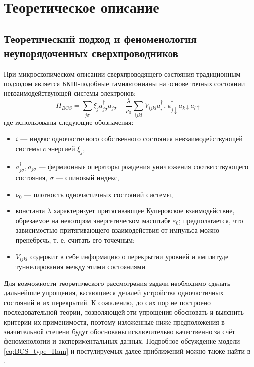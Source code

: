 \chapter{Теоретическое описание} \label{Theor}
\section{Теоретический подход и феноменология неупорядоченных сверхпроводников}
При микроскопическом описании сверхпроводящего состояния традиционным подходом является БКШ-подобные гамильтонианы на основе точных состояний невзаимодействующей системы электронов:
\begin{equation}
\label{eq:BCS_type_Ham}
H_{BCS} = \sum_{j\sigma} \xi_j a_{j\sigma}^\dagger a_{j\sigma} - \frac{\lambda}{\nu_0} \sum_{ijkl} V_{ijkl} a_{i\uparrow}^\dagger a_{j\downarrow}^\dagger a_{k\downarrow} a_{l\uparrow}
\end{equation}
где использованы следующие обозначения:
\begin{itemize}
	\item $i$ --- индекс одночастичного собственного состояния невзаимодействующей системы c энергией $\xi_j$,
	\item $a_{j\sigma}^\dagger, a_{j\sigma}$ --- фермионные операторы рождения уничтожения соответствующего состояния,  $\sigma$ --- спиновый индекс,
	\item $\nu_0$ --- плотность одночастичных состояний системы,
	\item константа $\lambda$ характеризует притягивающее Куперовское взаимодействие, обрезаемое на некотором энергетическом масштабе $\varepsilon_0$; предполагается, что  зависимостью притягивающего взаимодействия от импульса можно пренебречь, т. е. считать его точечным;
	\item $V_{ijkl}$ содержит в себе информацию о перекрытии уровней и амплитуде туннелирования между этими состояниями
\end{itemize}

Для возможности теоретического рассмотрения задачи необходимо сделать дальнейшие упрощения, касающиеся деталей устройства одночастичных состояний и их перекрытий. К сожалению, до сих пор не построено последовательной теории, позволяющей эти упрощения обосновать и выяснить критерии их применимости, поэтому изложенные ниже предположения в значительной степени будут обоснованы исключительно качественно за счёт феноменологии и экспериментальных данных. Подробное обсуждение модели \eqref{eq:BCS_type_Ham} и постулируемых далее приближений можно также найти в \cite{Feigelman2010}.


